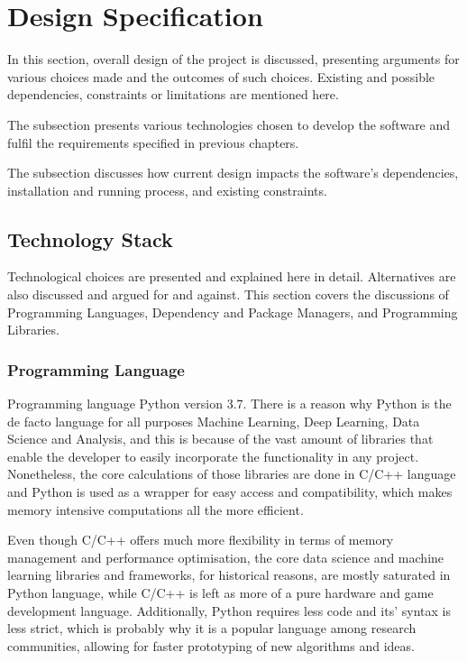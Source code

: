 \section{Design Specification}
    In this section, overall design of the project is discussed, presenting arguments for various choices made and the outcomes of such choices. Existing and possible dependencies, constraints or limitations are mentioned here.
    
    The  subsection presents various technologies chosen to develop the software and fulfil the requirements specified in previous chapters.
    
    The  subsection discusses how current design impacts the software's dependencies, installation and running process, and existing constraints.
    
    \subsection{Technology Stack} \label{techstack}
        Technological choices are presented and explained here in detail. Alternatives are also discussed and argued for and against. This section covers the discussions of Programming Languages, Dependency and Package Managers, and Programming Libraries.
        
        \subsubsection{Programming Language}
            Programming language Python version 3.7. There is a reason why Python is the de facto language for all purposes Machine Learning, Deep Learning, Data Science and Analysis, and this is because of the vast amount of libraries that enable the developer to easily incorporate the functionality in any project. Nonetheless, the core calculations of those libraries are done in C/C++ language and Python is used as a wrapper for easy access and compatibility, which makes memory intensive computations all the more efficient. 
            
            Even though C/C++ offers much more flexibility in terms of memory management and performance optimisation, the core data science and machine learning libraries and frameworks, for historical reasons, are mostly saturated in Python language, while C/C++ is left as more of a pure hardware and game development language. Additionally, Python requires less code and its' syntax is less strict, which is probably why it is a popular language among research communities, allowing for faster prototyping of new algorithms and ideas.
            

